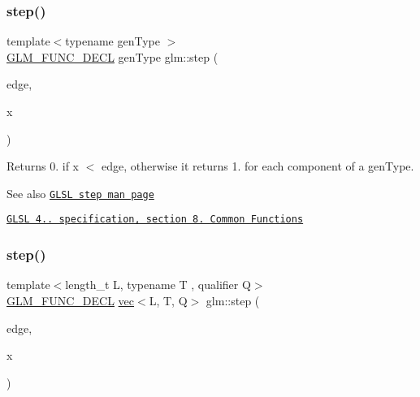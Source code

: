 \mbox{\label{group__core__func__common_ga015a1261ff23e12650211aa872863cce}} 
\subsubsection{\texorpdfstring{step()}{step()}\hspace{0.1cm}{\footnotesize\ttfamily [1/3]}}
{\footnotesize\ttfamily template$<$typename gen\+Type $>$ \\
\hyperlink{setup_8hpp_ab2d052de21a70539923e9bcbf6e83a51}{G\+L\+M\+\_\+\+F\+U\+N\+C\+\_\+\+D\+E\+CL} gen\+Type glm\+::step (\begin{DoxyParamCaption}\item[{gen\+Type}]{edge,  }\item[{gen\+Type}]{x }\end{DoxyParamCaption})}

Returns 0. if x $<$ edge, otherwise it returns 1. for each component of a gen\+Type.

\begin{DoxySeeAlso}{See also}
\href{http://www.opengl.org/sdk/docs/manglsl/xhtml/step.xml}{\tt G\+L\+SL step man page} 

\href{http://www.opengl.org/registry/doc/GLSLangSpec.4.20.8.pdf}{\tt G\+L\+SL 4.. specification, section 8. Common Functions} 
\end{DoxySeeAlso}
\mbox{\label{group__core__func__common_ga8f9a911a48ef244b51654eaefc81c551}} 
\subsubsection{\texorpdfstring{step()}{step()}\hspace{0.1cm}{\footnotesize\ttfamily [2/3]}}
{\footnotesize\ttfamily template$<$length\+\_\+t L, typename T , qualifier Q$>$ \\
\hyperlink{setup_8hpp_ab2d052de21a70539923e9bcbf6e83a51}{G\+L\+M\+\_\+\+F\+U\+N\+C\+\_\+\+D\+E\+CL} \hyperlink{structglm_1_1vec}{vec}$<$L, T, Q$>$ glm\+::step (\begin{DoxyParamCaption}\item[{T}]{edge,  }\item[{\hyperlink{structglm_1_1vec}{vec}$<$ L, T, Q $>$ const \&}]{x }\end{DoxyParamCaption})}


